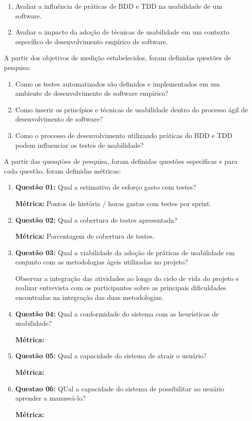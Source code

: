\begin{enumerate}
\item Avaliar a influência de práticas de BDD e TDD na usabilidade de um software. 

\item Avaliar o impacto da adoção de técnicas de usabilidade em um contexto específico de desenvolvimento empírico de software.
\end{enumerate}

A partir dos objetivos de medição estabelecidos, foram definidas questões de pesquisa:

\begin{enumerate}
\item Como os testes automatizados são definidos e implementados em um ambiente de desenvolvimento de software empírico?
\item Como inserir os princípios e técnicas de usabilidade dentro do processo ágil de desenvolvimento de software?
\item Como o processo de desenvolvimento utilizando práticas do BDD e TDD podem influenciar os testes de usabilidade?
\end{enumerate}

A partir das quesqtões de pesquisa, foram definidas questões especificas e para cada questão, foram definidas métricas:



\begin{enumerate}
\item \textbf{Questão 01: }Qual a estimativa de esforço gasto com testes?

	\textbf{Métrica: } Pontos de história / horas gastas com testes por sprint.

\item \textbf{Questão 02: }Qual a cobertura de testes apresentada?

	\textbf{Métrica: } Porcentagem de cobertura de testes.

\item \textbf{Questão 03: }Qual a viabilidade da adoção de práticas de usabilidade em conjunto com as metodologias ágeis utilizadas no projeto?

	Observar a integração das atividades ao longo do ciclo de vida do projeto e realizar entrevista com os participantes sobre as principais dificuldades encontradas na integração das duas metodologias.
\item \textbf{Questão 04: }Qual a conformidade do sistema com as heurísticas de usabilidade?

	\textbf{Métrica: }
\item \textbf{Questão 05: }Qual a capacidade do sistema de atrair o usuário?
	
	\textbf{Métrica: }
\item \textbf{Questao 06:} QUal a capacidade do sistema de possibilitar ao usuário aprender a manuseá-lo?

	\textbf{Métrica: }
\end{enumerate}

